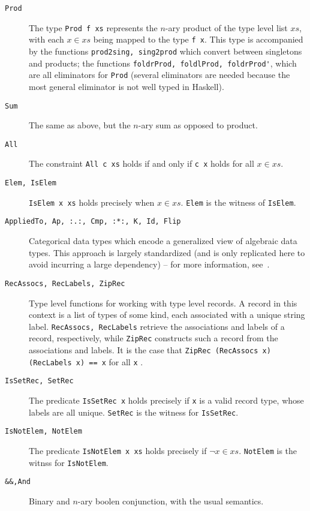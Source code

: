 \begin{description}
    \item[\texttt{Prod}] The type \lstinline{Prod f xs} 
    represents the $n$-ary product of the type
    level list $xs$, with each $x \in xs$ being mapped 
    to the type \lstinline{f x}. This 
    type is accompanied by the functions 
    \lstinline{prod2sing, sing2prod} which convert
    between singletons and products; the functions 
    \lstinline{foldrProd, foldlProd, foldrProd'}, 
    which are all eliminators for \lstinline{Prod} 
    (several eliminators are needed because the 
    most general eliminator is not well typed in 
    Haskell). 
    \item[\texttt{Sum}] The same as above, but the 
    $n$-ary sum as opposed to product. 
    \item[\texttt{All}] The constraint 
    \lstinline{All c xs} holds if and only if 
    \lstinline{c x} holds for 
    all $x \in xs$. 
    \item[\texttt{Elem, IsElem}]
    \lstinline{IsElem x xs} holds precisely when $x \in 
    xs$. 
    \lstinline{Elem} is the witness of 
    \lstinline{IsElem}. 
    \item[\texttt{AppliedTo, Ap, :.:, Cmp, :*:, K, Id, 
    Flip}] Categorical data types which encode
    a generalized view of algebraic data types. This 
    approach is largely standardized (and is only
    replicated here to avoid incurring a large 
    dependency) -- for more information, 
    see~\cite{alacarte}. 
    \item[\texttt{RecAssocs, RecLabels, ZipRec}] Type 
    level functions for working with type level 
    records. 
    A record in this context is a list of types of some 
    kind, each associated with a unique string label. 
    \lstinline{RecAssocs, RecLabels} retrieve the 
    associations and labels of a record, respectively, 
    while \lstinline{ZipRec} constructs such a record 
    from the associations and labels. It is the case
    that 
    \lstinline{ZipRec (RecAssocs x) (RecLabels x) == x} for all 
    \lstinline{x} .
    \item[\texttt{IsSetRec, SetRec}] The predicate 
    \lstinline{IsSetRec x} holds precisely if 
    \lstinline{x}
    is a valid record type, whose labels are all 
    unique. \lstinline{SetRec} is the witness for 
    \lstinline{IsSetRec}. 
    \item[\texttt{IsNotElem, NotElem}] The predicate 
    \lstinline{IsNotElem x xs} holds precisely if 
    $\lnot x \in xs$.
    \lstinline{NotElem} is the witnss for 
    \lstinline{IsNotElem}. 
    \item[\texttt{\&\&,And}] Binary and $n$-ary boolen 
    conjunction, with the usual semantics. 
\end{description}
    
